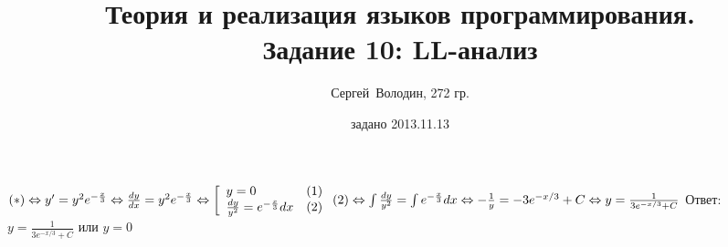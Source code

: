 \documentclass[a4paper]{article}
\title{Теория и реализация языков программирования.\\Задание 10: LL-анализ}
\date{задано 2013.11.13}
\author{Сергей~Володин, 272 гр.}
\begin{document}
$(*)\Leftrightarrow y'=y^2 e^{-\frac{x}{3}}\Leftrightarrow \frac{dy}{dx}=y^2 e^{-\frac{x}{3}}\Leftrightarrow  \left[ \begin{array}{lr} y=0 & (1)\\ \frac{dy}{y^2}=e^{-\frac{x}{3}}dx & (2)\\ \end{array}\right.\\
(2)\Leftrightarrow \int\frac{dy}{y^2}=\int e^{-\frac{x}{3}}dx\Leftrightarrow -\frac{1}{y}=-3 e^{-x/3}+C\Leftrightarrow y=\frac{1}{3 e^{-x/3}+C}$\newline
Ответ: $\boxed{y=\frac{1}{3 e^{-x/3}+C}\mbox{ или } y=0}$
\end{document}

